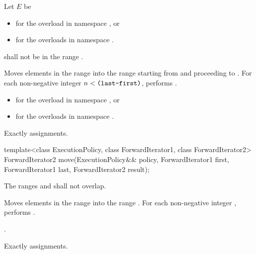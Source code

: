 \begin{itemdescr}
\pnum
Let $E$ be
\begin{itemize}
\item {} for the overload in namespace , or
\item {} for the overloads in namespace .
\end{itemize}

\pnum
\requires
{}
shall not be in the range
.

\pnum
\effects
Moves elements in the range 
into the range 
starting from  and proceeding to .
For each non-negative integer
$n < \texttt{(last-first)}$,
performs
.

\pnum
\returns
\begin{itemize}
\item
{} for the overload in namespace , or
\item
{} for the overloads in
  namespace .
\end{itemize}

\pnum
\complexity
Exactly
assignments.
\end{itemdescr}

%
\begin{itemdecl}
template<class ExecutionPolicy, class ForwardIterator1, class ForwardIterator2>
  ForwardIterator2 move(ExecutionPolicy&& policy,
                        ForwardIterator1 first, ForwardIterator1 last,
                        ForwardIterator2 result);
\end{itemdecl}

\begin{itemdescr}
\pnum
\requires The ranges  and
 shall not overlap.

\pnum
\effects Moves elements in the range  into
the range .
For each non-negative integer ,
performs .

\pnum
\returns {}.

\pnum
\complexity Exactly  assignments.
\end{itemdescr}

